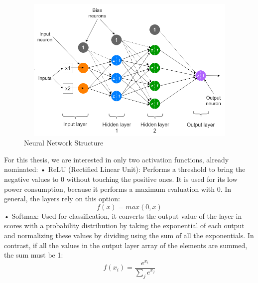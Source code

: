\begin{center}
    \begin{figure}[!h]
        \centering
        \includegraphics[width=15cm, height=7cm]{images/2.05 Neural Network Structure.png}
        \caption{Neural Network Structure \cite{image205}}
        \label{fig:neural network structure}
    \end{figure}
\end{center}
For this thesis, we are interested in only two activation functions, already nominated:\newline
• ReLU (Rectified Linear Unit): Performs a threshold to bring the negative values to 0 without touching the positive ones. It is used for its low power consumption, because it performs a maximum evaluation with 0. In general, the layers rely on this option:\newline
\begin{equation}
    f(x)=max(0,x)
\end{equation}
• Softmax: Used for classification, it converts the output value of the layer in scores with a probability distribution by taking the exponential of each output and normalizing these values by dividing using the sum of all the exponentials. In contrast, if all the values in the output layer array of the elements are summed, the sum must be 1:\newline
\begin{equation}
    f(x_i)=\frac{e^{x_i}}{\sum_je^{x_j}}
\end{equation}
